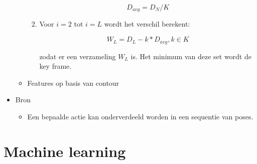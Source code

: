 \begin{itemize}
\begin{itemize}
\begin{enumerate}
			$$D_{avg} = D_N / K$$
			
			\item Voor $i = 2$ tot $i = L$ wordt het verschil berekent:
			
			$$W_L = D_L - k * D_{avg}, k \in K$$
			
			zodat er een verzameling ${W_L}$ is. Het minimum van deze set wordt de key frame.
		\end{enumerate}
		\item Features op basis van contour
	\end{itemize}

	\item Bron \cite{Action-Recognition-by-Shape-Matching-to-Key-Frames}
	\begin{itemize}
		\item Een bepaalde actie kan onderverdeeld worden in een sequentie van poses.
	\end{itemize}	
\end{itemize}

\chapter{Machine learning}
